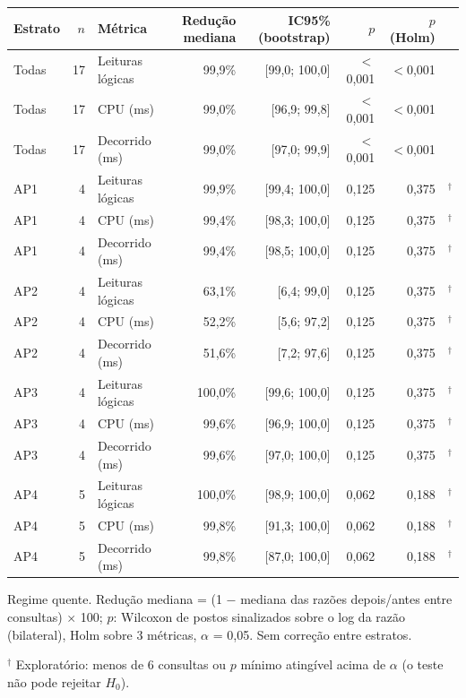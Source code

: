 {\small\setlength{\tabcolsep}{4pt}
\begin{tabular}{lrlrrrrl}
\toprule
Estrato & $n$ & Métrica & Redução mediana & IC95\% (bootstrap) & $p$ & $p$ (Holm) &  \\
\midrule
Todas & 17 & Leituras lógicas & 99,9\% & [99,0; 100,0] & $<$0,001 & $<$0,001 &  \\
Todas & 17 & CPU (ms) & 99,0\% & [96,9; 99,8] & $<$0,001 & $<$0,001 &  \\
Todas & 17 & Decorrido (ms) & 99,0\% & [97,0; 99,9] & $<$0,001 & $<$0,001 &  \\
\midrule
AP1 & 4 & Leituras lógicas & 99,9\% & [99,4; 100,0] & 0,125 & 0,375 & $^{\dagger}$ \\
AP1 & 4 & CPU (ms) & 99,4\% & [98,3; 100,0] & 0,125 & 0,375 & $^{\dagger}$ \\
AP1 & 4 & Decorrido (ms) & 99,4\% & [98,5; 100,0] & 0,125 & 0,375 & $^{\dagger}$ \\
\midrule
AP2 & 4 & Leituras lógicas & 63,1\% & [6,4; 99,0] & 0,125 & 0,375 & $^{\dagger}$ \\
AP2 & 4 & CPU (ms) & 52,2\% & [5,6; 97,2] & 0,125 & 0,375 & $^{\dagger}$ \\
AP2 & 4 & Decorrido (ms) & 51,6\% & [7,2; 97,6] & 0,125 & 0,375 & $^{\dagger}$ \\
\midrule
AP3 & 4 & Leituras lógicas & 100,0\% & [99,6; 100,0] & 0,125 & 0,375 & $^{\dagger}$ \\
AP3 & 4 & CPU (ms) & 99,6\% & [96,9; 100,0] & 0,125 & 0,375 & $^{\dagger}$ \\
AP3 & 4 & Decorrido (ms) & 99,6\% & [97,0; 100,0] & 0,125 & 0,375 & $^{\dagger}$ \\
\midrule
AP4 & 5 & Leituras lógicas & 100,0\% & [98,9; 100,0] & 0,062 & 0,188 & $^{\dagger}$ \\
AP4 & 5 & CPU (ms) & 99,8\% & [91,3; 100,0] & 0,062 & 0,188 & $^{\dagger}$ \\
AP4 & 5 & Decorrido (ms) & 99,8\% & [87,0; 100,0] & 0,062 & 0,188 & $^{\dagger}$ \\
\bottomrule
\end{tabular}\par
\vspace{3pt}
\begin{minipage}{\linewidth}\footnotesize
Regime quente. Redução mediana = (1 $-$ mediana das razões depois/antes entre consultas) $\times$ 100; $p$: Wilcoxon de postos sinalizados sobre o log da razão (bilateral), Holm sobre 3 métricas, $\alpha$ = 0,05. Sem correção entre estratos.\par
$^{\dagger}$ Exploratório: menos de 6 consultas ou $p$ mínimo atingível acima de $\alpha$ (o teste não pode rejeitar $H_0$).
\end{minipage}
}
